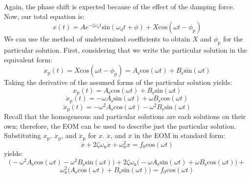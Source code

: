 \documentclass[12pt,letter]{article}
\begin{document}
 Again, the phase shift is expected because of the effect of the damping force. Now, our total equation is:
 \begin{equation}
  x(t) = Ae^{-\zeta \omega_\text{n} t}\text{sin}(\omega_\text{d} t + \phi) +  X \text{cos}(\omega t - \phi_\text{p})
 \end{equation}   
 We can use the method of undetermined coefficients to obtain $X$ and $\phi_\text{p}$ for the particular solution. First, considering that we write the particular solution in the equivalent form:
 \begin{equation}
  x_\text{p}(t) = X \text{cos}(\omega t - \phi_\text{p}) = A_\text{s} \text{cos}(\omega t) + B_\text{s}  \text{sin}(\omega t)
 \end{equation}    
 Taking the derivative of the assumed forms of the particular solution yields:
 \begin{equation}
  x_\text{p}(t) = A_\text{s} \text{cos}(\omega t) + B_\text{s}  \text{sin}(\omega t)
 \end{equation} 
 \begin{equation}
  \dot{x}_\text{p}(t) = -\omega A_\text{s} \text{sin}(\omega t) + \omega B_\text{s}  \text{cos}(\omega t)
 \end{equation}     
 \begin{equation}
  \ddot{x}_\text{p}(t) = -\omega^2 A_\text{s} \text{cos}(\omega t) - \omega^2 B_\text{s}  \text{sin}(\omega t)
 \end{equation}    
 Recall that the homogeneous and particular solutions are each solutions on their own; therefore, the EOM can be used to describe just the particular solution. Substituting $x_\text{p}$. $\dot{x}_\text{p}$, and $\ddot{x}_\text{p}$ for $x$. $\dot{x}$, and $\ddot{x}$ in the EOM in standard form:
 \begin{equation}
   \ddot{x}+2 \zeta \omega_\text{n} \dot{x} +\omega_\text{n}^2x = f_0\text{cos}(\omega t)
 \end{equation}
 yields:
 \begin{equation}
   \big( -\omega^2 A_\text{s} \text{cos}(\omega t) - \omega^2 B_\text{s}  \text{sin}(\omega t) \big)+2 \zeta \omega_\text{n}  \big( -\omega A_\text{s} \text{sin}(\omega t) + \omega B_\text{s}  \text{cos}(\omega t)  \big) +
 \end{equation}
 \begin{equation*}
  \omega_\text{n}^2 \big( A_\text{s} \text{cos}(\omega t) + B_\text{s}  \text{sin}(\omega t) \big) = f_0\text{cos}(\omega t)
 \end{equation*}    
\end{document}
